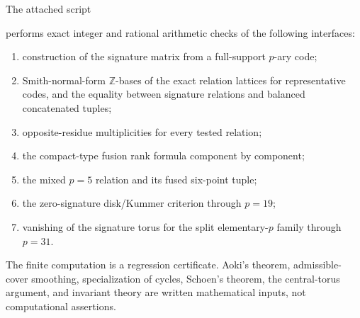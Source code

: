 \documentclass[11pt]{article}
\theoremstyle{definition}
\theoremstyle{remark}
\newcommand{\Z}{\mathbb Z}
\begin{document}
The attached script
\begin{quote}\small
{}
\end{quote}
performs exact integer and rational arithmetic checks of the following interfaces:
\begin{enumerate}
\item construction of the signature matrix from a full-support $p$-ary code;
\item Smith-normal-form $\Z$-bases of the exact relation lattices for representative codes, and the equality between signature relations and balanced concatenated tuples;
\item opposite-residue multiplicities for every tested relation;
\item the compact-type fusion rank formula component by component;
\item the mixed $p=5$ relation and its fused six-point tuple;
\item the zero-signature disk/Kummer criterion through $p=19$;
\item vanishing of the signature torus for the split elementary-$p$ family through $p=31$.
\end{enumerate}
The finite computation is a regression certificate.  Aoki's theorem, admissible-cover smoothing, specialization of cycles, Schoen's theorem, the central-torus argument, and invariant theory are written mathematical inputs, not computational assertions.
\end{document}
